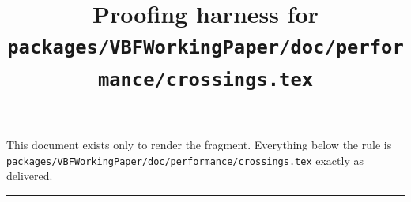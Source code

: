 \documentclass[10pt]{article}
\title{Proofing harness for \texttt{packages/VBFWorkingPaper/doc/performance/crossings.tex}}
\author{}
\date{}
\begin{document}
\maketitle

\noindent
This document exists only to render the fragment. Everything below the rule is
\verb|packages/VBFWorkingPaper/doc/performance/crossings.tex| exactly as delivered.

\hrule\vspace{1em}


\end{document}
